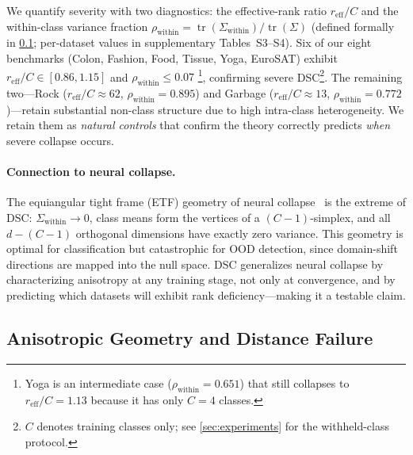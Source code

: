\documentclass[runningheads]{llncs}
\begin{document}
We quantify severity with two diagnostics:
the effective-rank ratio $r_{\mathrm{eff}}/C$ and the within-class variance fraction
$\rho_{\mathrm{within}} = \operatorname{tr}(\Sigma_{\mathrm{within}}) / \operatorname{tr}(\Sigma)$
(defined formally in \cref{sec:theory:aniso}; per-dataset values in supplementary Tables~S3--S4).
Six of our eight benchmarks (Colon, Fashion, Food, Tissue, Yoga, EuroSAT) exhibit
$r_{\mathrm{eff}}/C \in [0.86, 1.15]$ and $\rho_{\mathrm{within}} \le 0.07$%
\footnote{Yoga is an intermediate case ($\rho_{\mathrm{within}} = 0.651$) that still collapses to $r_{\mathrm{eff}}/C = 1.13$ because it has only $C{=}4$ classes.},
confirming severe DSC\footnote{$C$ denotes training classes only; see \cref{sec:experiments} for the withheld-class protocol.}.
The remaining two---Rock ($r_{\mathrm{eff}}/C \approx 62$, $\rho_{\mathrm{within}} = 0.895$)
and Garbage ($r_{\mathrm{eff}}/C \approx 13$, $\rho_{\mathrm{within}} = 0.772$)---retain
substantial non-class structure due to high intra-class heterogeneity.
We retain them as \emph{natural controls} that confirm the theory correctly predicts
\emph{when} severe collapse occurs.

\paragraph{Connection to neural collapse.}
The equiangular tight frame (ETF) geometry of neural collapse~\cite{Papyan2020nc,Zhu2021nc} is the extreme of DSC: $\Sigma_{\mathrm{within}} \to 0$, class means form the vertices of a $(C{-}1)$-simplex, and all $d - (C{-}1)$ orthogonal dimensions have exactly zero variance.
This geometry is optimal for classification but catastrophic for OOD detection, since domain-shift directions are mapped into the null space.
DSC generalizes neural collapse by characterizing anisotropy at any training stage, not only at convergence, and by predicting which datasets will exhibit rank deficiency---making it a testable claim.

\subsection{Anisotropic Geometry and Distance Failure}
\label{sec:theory:aniso}
\end{document}

